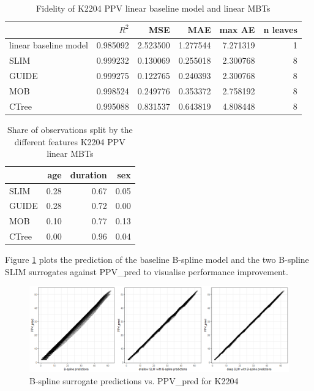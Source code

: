 \begin{table}[!htb]
\caption{Fidelity of K2204 PPV linear baseline model and linear MBTs}
\centering \scriptsize
\begin{tabular}[t]{l|r|r|r|r|r}
\hline
  & $R^2$ & MSE & MAE & max AE & n leaves\\
\hline
linear baseline model & 0.985092 & 2.523500 & 1.277544 & 7.271319 & 1\\
\hline
SLIM & 0.999232 & 0.130069 & 0.255018 & 2.300768 & 8\\
GUIDE & 0.999275 & 0.122765 & 0.240393 & 2.300768 & 8\\
MOB & 0.998524 & 0.249776 & 0.353372 & 2.758192 & 8\\
CTree & 0.995088 & 0.831537 & 0.643819 & 4.808448 & 8\\
\hline
\end{tabular}
\label{tab:ins_k2204_ppv_lm_surrogates_perf}
\end{table}


\begin{table}[!htb]
\caption{Share of observations split by the different features K2204 PPV linear MBTs}
\centering \scriptsize
\begin{tabular}[t]{l|r|r|r}
\hline
& age & duration & sex\\
\hline
SLIM & 0.28 & 0.67 & 0.05\\
GUIDE & 0.28 & 0.72 & 0.00\\
MOB & 0.10 & 0.77 & 0.13\\
CTree & 0.00 & 0.96 & 0.04\\
\hline
\end{tabular}
\label{tab:ins_k2204_ppv_lm_surrogates_share}
\end{table}



Figure \ref{fig:ins_k2204_ppv_fit} plots the prediction of the baseline B-spline model and the two B-spline SLIM surrogates against PPV\_pred to visualise performance improvement. 

\begin{figure}[!htb]
    \centering    
    \includegraphics[width = 14cm]{Figures/insurance_use_case/k2204_PPV/fit.png}
    \caption{B-spline surrogate predictions vs. PPV\_pred for K2204}
    \label{fig:ins_k2204_ppv_fit}
\end{figure}

